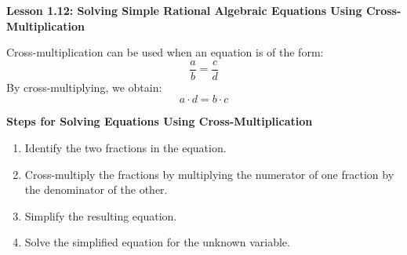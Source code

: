 \begin{center}
\textbf{Lesson 1.12: Solving Simple Rational Algebraic Equations Using Cross-Multiplication}
\end{center}

 	\vspace*{-2ex}
\noindent Cross-multiplication can be used when an equation is of the form:
\vspace*{-1ex}
	\[
	\frac{a}{b} = \frac{c}{d}
	\]
	\vspace*{-1ex}
By cross-multiplying, we obtain:
	\vspace*{-1ex}
	\[
	a \cdot d = b \cdot c
	\]
	\vspace*{-1ex}
	
	\textbf{Steps for Solving Equations Using Cross-Multiplication}
	\begin{enumerate}[label = \color{blue}\arabic*. ]
		\item Identify the two fractions in the equation.
		\item Cross-multiply the fractions by multiplying the numerator of one fraction by the denominator of the other.
		\item Simplify the resulting equation.
		\item Solve the simplified equation for the unknown variable.
	\end{enumerate}
	
	 
	  